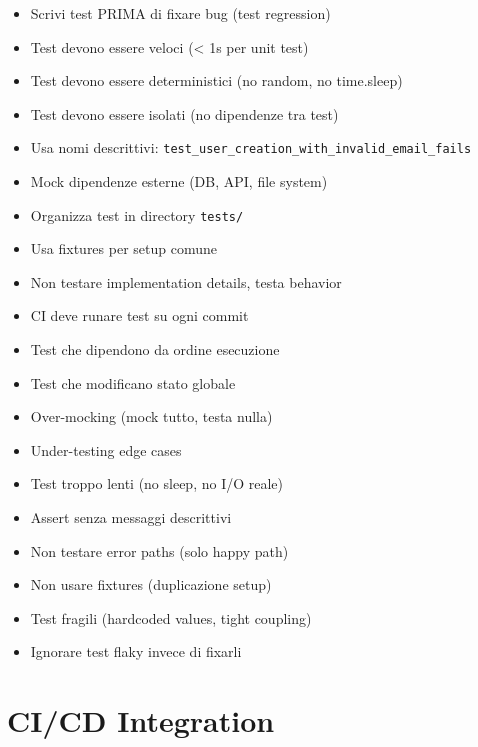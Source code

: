 \begin{tcolorbox}[title=Best Practices Testing]
\begin{itemize}
  \item Scrivi test PRIMA di fixare bug (test regression)
  \item Test devono essere veloci (< 1s per unit test)
  \item Test devono essere deterministici (no random, no time.sleep)
  \item Test devono essere isolati (no dipendenze tra test)
  \item Usa nomi descrittivi: \texttt{test\_user\_creation\_with\_invalid\_email\_fails}
  \item Mock dipendenze esterne (DB, API, file system)
  \item Organizza test in directory \texttt{tests/}
  \item Usa fixtures per setup comune
  \item Non testare implementation details, testa behavior
  \item CI deve runare test su ogni commit
\end{itemize}
\end{tcolorbox}

\begin{tcolorbox}[title=Errori Comuni]
\begin{itemize}
  \item Test che dipendono da ordine esecuzione
  \item Test che modificano stato globale
  \item Over-mocking (mock tutto, testa nulla)
  \item Under-testing edge cases
  \item Test troppo lenti (no sleep, no I/O reale)
  \item Assert senza messaggi descrittivi
  \item Non testare error paths (solo happy path)
  \item Non usare fixtures (duplicazione setup)
  \item Test fragili (hardcoded values, tight coupling)
  \item Ignorare test flaky invece di fixarli
\end{itemize}
\end{tcolorbox}

\section{CI/CD Integration}

